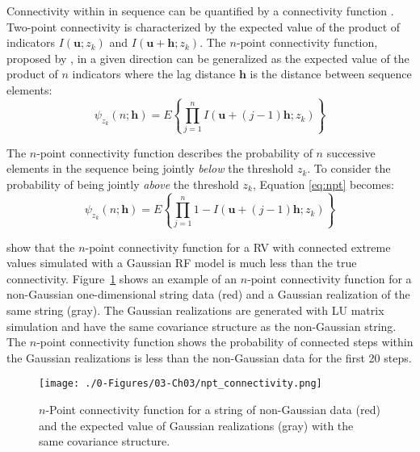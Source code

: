Connectivity within in sequence can be quantified by a connectivity function \citep{renard2011conditioning}. Two-point connectivity is characterized by the expected value of the product of indicators $I(\mathbf{u}; z_{k})$ and $I(\mathbf{u}+\mathbf{h}; z_{k})$. The $n\text{-point}$ connectivity function, proposed by \cite{journel1989nongaussian}, in a given direction can be generalized as the expected value of the product of $n$ indicators where the lag distance $\mathbf{h}$ is the distance between sequence elements:
\begin{equation}
    \psi_{z_{k}}(n;\mathbf{h}) = E\left\{\prod_{j=1}^{n} I(\mathbf{u} + (j-1)\mathbf{h}; z_{k})\right\}
    \label{eq:npt}
\end{equation}

The $n\text{-point}$ connectivity function describes the probability of $n$ successive elements in the sequence being jointly \emph{below} the threshold $z_{k}$. To consider the probability of being jointly \emph{above} the threshold $z_{k}$, Equation \ref{eq:npt} becomes:
\begin{equation}
    \psi_{z_{k}}(n;\mathbf{h}) = E\left\{\prod_{j=1}^{n} 1 - I(\mathbf{u} + (j-1)\mathbf{h}; z_{k})\right\}
    \label{eq:npt2}
\end{equation}

\cite{journel1989nongaussian} show that the $n\text{-point}$ connectivity function for a \gls{RV} with connected extreme values simulated with a Gaussian \gls{RF} model is much less than the true connectivity. Figure~\ref{fig:npt_connectivity} shows an example of an $n\text{-point}$ connectivity function for a non-Gaussian one-dimensional string data (red) and a Gaussian realization of the same string (gray). The Gaussian realizations are generated with LU matrix simulation \citep{davis1987production} and have the same covariance structure as the non-Gaussian string. The $n$-point connectivity function shows the probability of connected steps within the Gaussian realizations is less than the non-Gaussian data for the first 20 steps.

\begin{figure}[htb!]
    \centering
    \texttt{[image: ./0-Figures/03-Ch03/npt\_connectivity.png]}
    \caption{$n$-Point connectivity function for a string of non-Gaussian data (red) and the expected value of Gaussian realizations (gray) with the same covariance structure.}
    \label{fig:npt_connectivity}
\end{figure}

